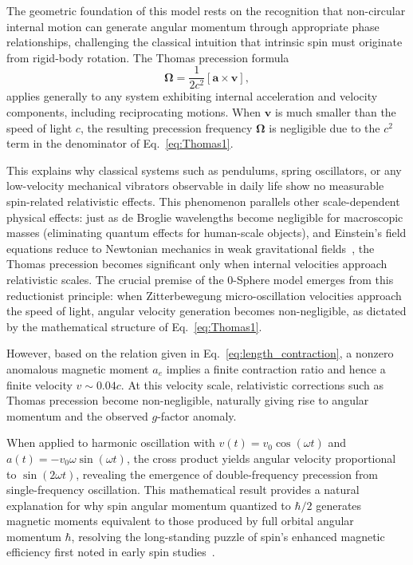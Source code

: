 \documentclass[%
 reprint,
 amsmath,amssymb,
 aps,
]{revtex4-1}
\numberwithin{equation}{section}%
\begin{document}
The geometric foundation of this model rests on the recognition that non-circular internal motion can generate angular momentum through appropriate phase relationships, challenging the classical intuition that intrinsic spin must originate from rigid-body rotation. The Thomas precession formula~\cite{thomas1926,thomas1927}
\begin{equation}
    \boldsymbol{\Omega} = \frac{1}{2c^2}[\mathbf{a} \times \mathbf{v}],
    \label{eq:Thomas1}
\end{equation}
applies generally to any system exhibiting internal acceleration and velocity components, including reciprocating motions. When $\boldsymbol{v}$ is much smaller than the speed of light $c$, the resulting precession frequency $\boldsymbol{\Omega}$ is negligible due to the $c^2$ term in the denominator of Eq.~\eqref{eq:Thomas1}.

This explains why classical systems such as pendulums, spring oscillators, or any low-velocity mechanical vibrators observable in daily life show no measurable spin-related relativistic effects. This phenomenon parallels other scale-dependent physical effects: just as de Broglie wavelengths become negligible for macroscopic masses (eliminating quantum effects for human-scale objects), and Einstein's field equations reduce to Newtonian mechanics in weak gravitational fields~\cite{jackson1999}, the Thomas precession becomes significant only when internal velocities approach relativistic scales. The crucial premise of the 0-Sphere model emerges from this reductionist principle: when Zitterbewegung micro-oscillation velocities approach the speed of light, angular velocity generation becomes non-negligible, as dictated by the mathematical structure of Eq.~\eqref{eq:Thomas1}.

However, based on the relation given in Eq.~\eqref{eq:length_contraction}, a nonzero anomalous magnetic moment $a_e$ implies a finite contraction ratio and hence a finite velocity $v \sim 0.04c$. At this velocity scale, relativistic corrections such as Thomas precession become non-negligible, naturally giving rise to angular momentum and the observed $g$-factor anomaly.

When applied to harmonic oscillation with $v(t) = v_0\cos(\omega t)$ and $a(t) = -v_0\omega\sin(\omega t)$, the cross product yields angular velocity proportional to $\sin(2\omega t)$, revealing the emergence of double-frequency precession from single-frequency oscillation. This mathematical result provides a natural explanation for why spin angular momentum quantized to $\hbar/2$ generates magnetic moments equivalent to those produced by full orbital angular momentum $\hbar$, resolving the long-standing puzzle of spin's enhanced magnetic efficiency first noted in early spin studies~\cite{uhlenbeck1925, uhlenbeck1926}.
\end{document}
